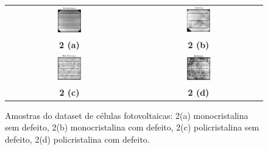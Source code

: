 \documentclass[conference]{IEEEtran}
\begin{document}
\begin{figure}[htbp]
    \centering
    \begin{tabular}{cc}
        \includegraphics[width=0.20\textwidth]{images/mono-no-defect.png} &
        \includegraphics[width=0.20\textwidth]{images/mono-defect.png}
        \\
        \textbf{2 (a)}                                                    &
        \textbf{2 (b)}                                                      \\
        \includegraphics[width=0.20\textwidth]{images/poly-no-defect.png} &
        \includegraphics[width=0.20\textwidth]{images/poly-defect.png}
        \\
        \textbf{2 (c)}                                                    &
        \textbf{2 (d)}                                                      \\
    \end{tabular}
    \caption{Amostras do dataset de células fotovoltaicas: 2(a) monocristalina
        sem defeito, 2(b) monocristalina com defeito, 2(c) policristalina sem
        defeito,
        2(d) policristalina com defeito. \cite{Deitsch2021}}
    \label{fig:amostras-dataset}
\end{figure}
\end{document}
